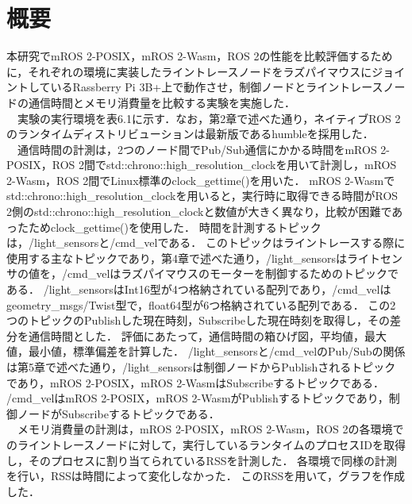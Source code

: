 \section{概要}
本研究でmROS 2-POSIX，mROS 2-Wasm，ROS 2の性能を比較評価するために，それぞれの環境に実装したライントレースノードをラズパイマウスにジョイントしているRassberry Pi 3B+上で動作させ，制御ノードとライントレースノードの通信時間とメモリ消費量を比較する実験を実施した．
\\　実験の実行環境を表6.1に示す．なお，第2章で述べた通り，ネイティブROS 2のランタイムディストリビューションは最新版であるhumbleを採用した．
\\　通信時間の計測は，2つのノード間でPub/Sub通信にかかる時間をmROS 2-POSIX，ROS 2間でstd::chrono::high\_resolution\_clockを用いて計測し，mROS 2-Wasm，ROS 2間でLinux標準のclock\_gettime()を用いた．
mROS 2-Wasmでstd::chrono::high\_resolution\_clockを用いると，実行時に取得できる時間がROS 2側のstd::chrono::high\_resolution\_clockと数値が大きく異なり，比較が困難であったためclock\_gettime()を使用した．
時間を計測するトピックは，/light\_sensorsと/cmd\_velである．
このトピックはライントレースする際に使用する主なトピックであり，第4章で述べた通り，/light\_sensorsはライトセンサの値を，/cmd\_velはラズパイマウスのモーターを制御するためのトピックである．
/light\_sensorsはInt16型が4つ格納されている配列であり，/cmd\_velはgeometry\_msgs/Twist型で，float64型が6つ格納されている配列である．
この2つのトピックのPublishした現在時刻，Subscribeした現在時刻を取得し，その差分を通信時間とした．
評価にあたって，通信時間の箱ひげ図，平均値，最大値，最小値，標準偏差を計算した．
/light\_sensorsと/cmd\_velのPub/Subの関係は第5章で述べた通り，/light\_sensorsは制御ノードからPublishされるトピックであり，mROS 2-POSIX，mROS 2-WasmはSubscribeするトピックである．
/cmd\_velはmROS 2-POSIX，mROS 2-WasmがPublishするトピックであり，制御ノードがSubscribeするトピックである．
\\　メモリ消費量の計測は，mROS 2-POSIX，mROS 2-Wasm，ROS 2の各環境でのライントレースノードに対して，実行しているランタイムのプロセスIDを取得し，そのプロセスに割り当てられているRSSを計測した．
各環境で同様の計測を行い，RSSは時間によって変化しなかった．
このRSSを用いて，グラフを作成した．
